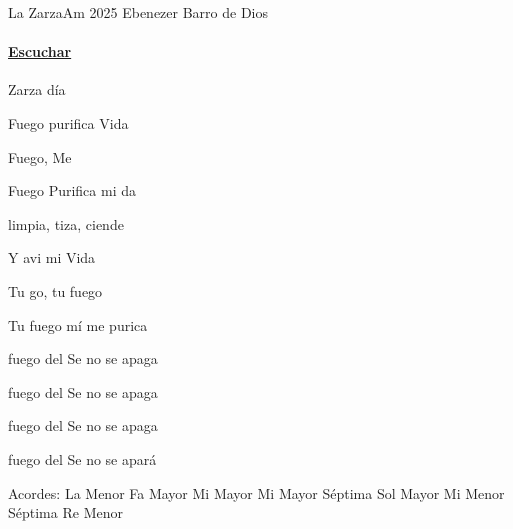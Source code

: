 \documentclass[12pt, spanish]{book}
\begin{document}
    \begin{song}{La Zarza}{Am}
    {2025} %
    {Ebenezer Barro de Dios}
    {} %
    {}
        \ifChordBk
        \paragraph{\mbox{}\hfill\protect\href{https://open.spotify.com/intl-es/track/7Jk1Cw4FSiFjycTwLHXuWU}{Escuchar}\mbox{}\hfill}
        \fi


        \begin{SBOpGroup}
             Zarza   día

             Fuego purifica  Vida

             Fuego, Me 

             Fuego Purifica mi da
        \end{SBOpGroup}

        \begin{SBChorus}
             limpia, tiza, ciende

            Y avi mi Vida

            Tu go, tu fuego

            Tu fuego  mí me purica
        \end{SBChorus}

        \begin{SBOpGroup}
             fuego del Se no se apaga

             fuego del Se no se apaga

             fuego del Se no se apaga

             fuego del Se no se apará
        \end{SBOpGroup}

        \ifChordBk
        \begin{SBOpGroup}
            Acordes:\break
            \upchord{\Am}\qquad La Menor \hfill
            \upchord{\F}\qquad Fa Mayor \hfill\null\break
            \upchord{\E}\qquad Mi Mayor \hfill
            \upchord{\Eseven}\qquad Mi Mayor S\'eptima \hfill\null\break
            \upchord{\G}\qquad Sol Mayor \hfill
            \upchord{\Emseven}\qquad Mi Menor S\'eptima \hfill\null\break
            \upchord{\Dm}\qquad Re Menor \hfill\null\break
        \end{SBOpGroup}
        \fi
    \end{song}
\end{document}
